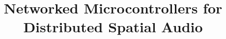 \documentclass[utf8]{FrontiersinHarvard}
\begin{document}
    \onecolumn

    \title[Networked Microcontrollers for Distributed Spatial Audio]
    {Networked Microcontrollers for Distributed Spatial Audio}

    \author[\firstAuthorLast ]{\Authors}
    \address{}
    \correspondance{}

    \extraAuth{}

    \maketitle

    \listoftodos

    

    

    

    

    

    
    
\end{document}
